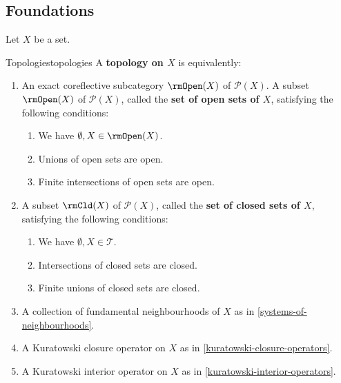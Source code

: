 \subsection{Foundations}\label{subsection-topologies-foundations}
Let $X$ be a set.
\begin{definition}{Topologies}{topologies}%
    A \textbf{topology on $X$} is equivalently:%
    \begin{enumerate}
        \item\label{topologies-1}An exact coreflective subcategory $\rmOpen(X)$ of $\mathcal{P}(X)$.
%
%
%
%
            A subset $\rmOpen(X)$ of $\mathcal{P}(X)$, called the \textbf{set of open sets of $X$}, satisfying the following conditions:
            \begin{enumerate}
                \item\label{topologies-1-a}We have $\emptyset,X\in\rmOpen(X)$.%
                \item\label{topologies-1-b}Unions of open sets are open.
                \item\label{topologies-1-c}Finite intersections of open sets are open.
            \end{enumerate}
        \item\label{topologies-2}A subset $\rmCld(X)$ of $\mathcal{P}(X)$, called the \textbf{set of closed sets of $X$}, satisfying the following conditions:
            \begin{enumerate}
                \item\label{topologies-2-a}We have $\emptyset,X\in\mathcal{T}$.%
                \item\label{topologies-2-b}Intersections of closed sets are closed.
                \item\label{topologies-2-c}Finite unions of closed sets are closed.
            \end{enumerate}
        \item\label{topologies-3}A collection of fundamental neighbourhoods of $X$ as in  \cref{systems-of-neighbourhoods}.
        \item\label{topologies-4}A Kuratowski closure operator  on $X$ as in \cref{kuratowski-closure-operators}.
        \item\label{topologies-5}A Kuratowski interior operator on $X$ as in \cref{kuratowski-interior-operators}.
    \end{enumerate}
\end{definition}
